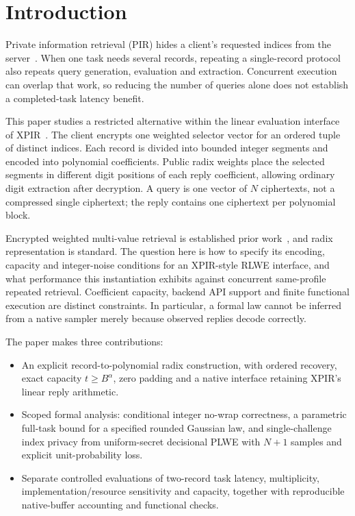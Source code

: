 \section{Introduction}
\label{sec:intro}
Private information retrieval (PIR) hides a client's requested indices
from the server~\cite{chor1998private,kushilevitz1997replication}.
When one task needs several records, repeating a single-record protocol
also repeats query generation, evaluation and extraction. Concurrent
execution can overlap that work, so reducing the number of queries alone
does not establish a completed-task latency benefit.

This paper studies a restricted alternative within the linear evaluation
interface of XPIR~\cite{melchor2016xpir}. The client encrypts one weighted
selector vector for an ordered tuple of distinct indices. Each record
is divided into bounded integer segments and encoded into polynomial
coefficients. Public radix weights place the selected segments in
different digit positions of each reply coefficient, allowing ordinary
digit extraction after decryption. A query is one vector of \(N\)
ciphertexts, not a compressed single ciphertext; the reply contains
one ciphertext per polynomial block.

Encrypted weighted multi-value retrieval is established prior
work~\cite{mulityquery}, and radix representation is standard. The question
here is how to specify its encoding, capacity and integer-noise conditions
for an XPIR-style RLWE interface, and what performance this instantiation
exhibits against concurrent same-profile repeated retrieval. Coefficient
capacity, backend API support and finite functional execution are distinct
constraints. In particular, a formal law cannot be inferred from a
native sampler merely because observed replies decode correctly.

The paper makes three contributions:
\begin{itemize}
\item An explicit record-to-polynomial radix construction, with ordered
recovery, exact capacity \(t\ge B^\alpha\), zero padding and a native
interface retaining XPIR's linear reply arithmetic.
\item Scoped formal analysis: conditional integer no-wrap correctness,
a parametric full-task bound for a specified rounded Gaussian law, and
single-challenge index privacy from uniform-secret decisional PLWE with
\(N+1\) samples and explicit unit-probability loss.
\item Separate controlled evaluations of two-record task latency,
multiplicity, implementation/resource sensitivity and capacity, together
with reproducible native-buffer accounting and functional checks.
\end{itemize}

